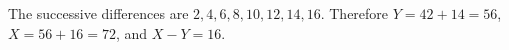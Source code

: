The successive differences are $2,4,6,8,10,12,14,16$. Therefore $Y=42+14=56$, $X=56+16=72$, and $\boxed{X-Y=16}$.
